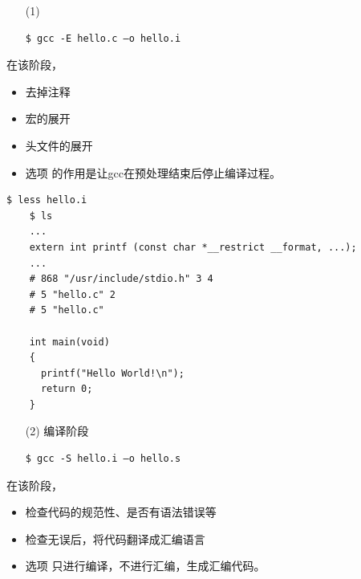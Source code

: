 \begin{frame}[fragile]\ft{\secname} 
  \begin{itemize}
  \item[(1)] 
\begin{lstlisting}[backgroundcolor=\color{red!10}]
$ gcc -E hello.c –o hello.i 
\end{lstlisting}    
\end{itemize}

在该阶段，
    \begin{itemize}
    \item 去掉注释
    \item 宏的展开
    \item 头文件的展开
    \item 选项  的作用是让gcc在预处理结束后停止编译过程。
    \end{itemize}   
\end{frame}


\begin{frame}[fragile]\ft{\secname}
  \begin{lstlisting}[basicstyle=\ttfamily\footnotesize,backgroundcolor=\color{red!10}]
    $ less hello.i
    $ ls 
    ...
    extern int printf (const char *__restrict __format, ...);
    ...
    # 868 "/usr/include/stdio.h" 3 4
    # 5 "hello.c" 2
    # 5 "hello.c"

    int main(void)
    {
      printf("Hello World!\n");
      return 0;
    }
  \end{lstlisting}
\end{frame}





\begin{frame}[fragile]\ft{\secname}
  \begin{itemize}
  \item[(2)] 编译阶段
\begin{lstlisting}[backgroundcolor=\color{red!10}]
$ gcc -S hello.i –o hello.s
\end{lstlisting}
\end{itemize}

在该阶段，
\begin{itemize}
\item 检查代码的规范性、是否有语法错误等
\item 检查无误后，将代码翻译成汇编语言
\item 选项  只进行编译，不进行汇编，生成汇编代码。 
\end{itemize}

\end{frame}


